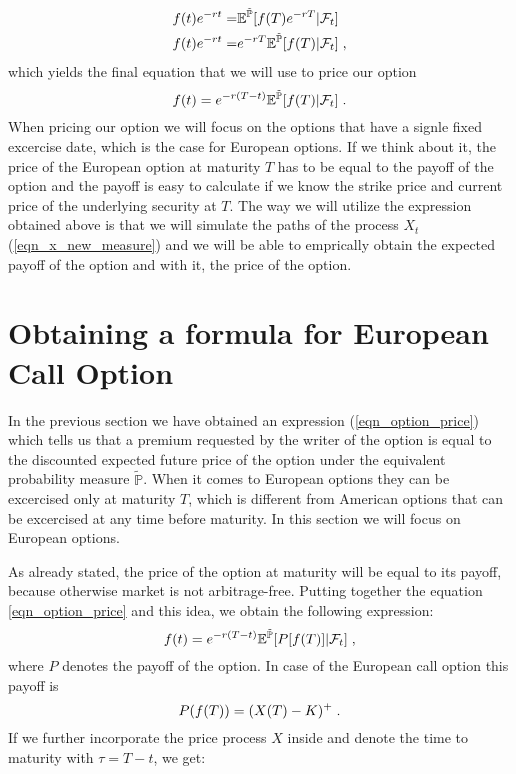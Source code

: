 \documentclass[times, utf8, diplomski]{fer}
\begin{document}
\begin{equation*}
	\begin{split}
		f(t)e^{-rt} =& \mathbb{E}^{\tilde{\mathbb{P}}}[f(T)e^{-rT}|\mathcal{F}_t]\\
		f(t)e^{-rt} =& e^{-rT}\mathbb{E}^{\tilde{\mathbb{P}}}[f(T)|\mathcal{F}_t] \hspace{0.1cm},
	\end{split}	
\end{equation*}
which yields the final equation that we will use to price our option
\begin{equation} \label{eqn_option_price}
	f(t) = e^{-r(T-t)} \mathbb{E}^{\tilde{\mathbb{P}}}[f(T)|\mathcal{F}_t] \hspace{0.1cm}.
\end{equation}
When pricing our option we will focus on the options that have a signle fixed excercise date, which is the case for European options. If we think about it, the price of the European option at maturity $T$ has to be equal to the payoff of the option and the payoff is easy to calculate if we know the strike price and current price of the underlying security at $T$. The way we will utilize the expression obtained above is that we will simulate the paths of the process $X_t$ (\ref{eqn_x_new_measure}) and we will be able to emprically obtain the expected payoff of the option and with it, the price of the option.

\section{Obtaining a formula for European Call Option}
In the previous section we have obtained an expression (\ref{eqn_option_price}) which tells us that a premium requested by the writer of the option is equal to the discounted expected future price of the option under the equivalent probability measure $\tilde{\mathbb{P}}$. When it comes to European options they can be excercised only at maturity $T$, which is different from American options that can be excercised at any time before maturity. In this section we will focus on European options. 

\noindent As already stated, the price of the option at maturity will be equal to its payoff, because otherwise market is not arbitrage-free. Putting together the equation \ref{eqn_option_price} and this idea, we obtain the following expression: 
\begin{equation}
	f(t) = e^{-r(T-t)} \mathbb{E}^{\tilde{\mathbb{P}}}[P[f(T)]|\mathcal{F}_t] \hspace{0.1cm},
\end{equation} where $P$ denotes the payoff of the option. In case of the European call option this payoff is $$P(f(T)) = (X(T) - K)^+ \hspace{0.1cm}.$$ If we further incorporate the price process $X$ inside and denote the time to maturity with $\tau = T - t$, we get:
\end{document}
